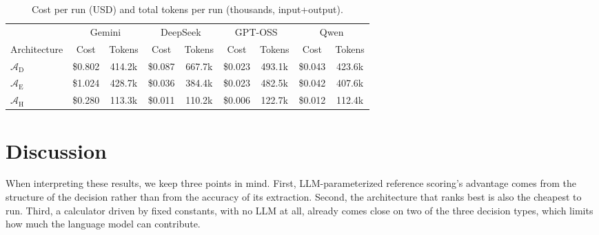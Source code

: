 \documentclass[final,3p,times]{elsarticle}
\begin{document}
\begin{table}[htbp]
\caption{Cost per run (USD) and total tokens per run (thousands, input+output).}
\label{tab:item8}
\centering
\begin{threeparttable}
\centering
\small
\renewcommand{\arraystretch}{1.15}
\setlength{\tabcolsep}{4pt}
\begin{tabular}{l cc cc cc cc}
\toprule
 & \multicolumn{2}{c}{Gemini} & \multicolumn{2}{c}{DeepSeek} & \multicolumn{2}{c}{GPT-OSS} & \multicolumn{2}{c}{Qwen} \\
\cmidrule(lr){2-3}\cmidrule(lr){4-5}\cmidrule(lr){6-7}\cmidrule(lr){8-9}
Architecture & Cost & Tokens & Cost & Tokens & Cost & Tokens & Cost & Tokens \\
\midrule
$\mathcal{A}_{\text{D}}$ & \$0.802 & 414.2k & \$0.087 & 667.7k & \$0.023 & 493.1k & \$0.043 & 423.6k \\
$\mathcal{A}_{\text{E}}$ & \$1.024 & 428.7k & \$0.036 & 384.4k & \$0.023 & 482.5k & \$0.042 & 407.6k \\
$\mathcal{A}_{\text{H}}$ & \$0.280 & 113.3k & \$0.011 & 110.2k & \$0.006 & 122.7k & \$0.012 & 112.4k \\
\bottomrule
\end{tabular}
\setlength{\tabcolsep}{6pt}
\renewcommand{\arraystretch}{1.0}
\end{threeparttable}
\end{table}

\FloatBarrier
\section{Discussion}
\label{sec:discussion}

When interpreting these results, we keep three points in mind. First, LLM-parameterized reference scoring's advantage comes from the structure of the decision rather than from the accuracy of its extraction. Second, the architecture that ranks best is also the cheapest to run. Third, a calculator driven by fixed constants, with no LLM at all, already comes close on two of the three decision types, which limits how much the language model can contribute.

\FloatBarrier
\end{document}
